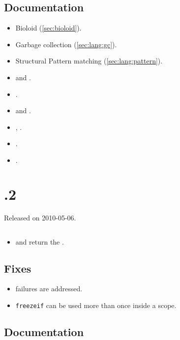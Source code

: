 \subsection{Documentation}
\begin{itemize}
\item Bioloid (\autoref{sec:bioloid}).
\item Garbage collection (\autoref{sec:lang:gc}).
\item Structural Pattern matching (\autoref{sec:lang:pattern}).
\item {} and .
\item {}.
\item {} and .
\item {}, .
\item {}.
\item {}.
\end{itemize}

\section{.2}
Released on 2010-05-06.

\subsection{\us}
\begin{itemize}
\item {} and  return the
  .
\end{itemize}

\subsection{Fixes}
\begin{itemize}
\item {} failures are addressed.
\item \lstinline|freezeif| can be used more than once inside a scope.
\end{itemize}

\subsection{Documentation}

